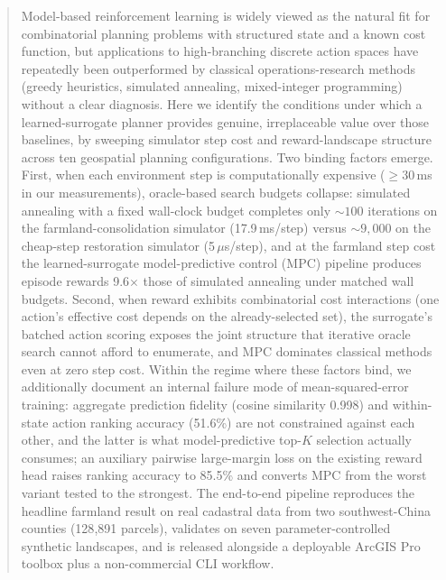 \documentclass[11pt]{article}
\begin{document}
\begin{abstract}
Model-based reinforcement learning is widely viewed as the natural fit for combinatorial planning problems with structured state and a known cost function, but applications to high-branching discrete action spaces have repeatedly been outperformed by classical operations-research methods (greedy heuristics, simulated annealing, mixed-integer programming) without a clear diagnosis. Here we identify the conditions under which a learned-surrogate planner provides genuine, irreplaceable value over those baselines, by sweeping simulator step cost and reward-landscape structure across ten geospatial planning configurations. Two binding factors emerge. First, when each environment step is computationally expensive ($\geq 30$\,ms in our measurements), oracle-based search budgets collapse: simulated annealing with a fixed wall-clock budget completes only $\sim 100$ iterations on the farmland-consolidation simulator (17.9\,ms/step) versus $\sim 9{,}000$ on the cheap-step restoration simulator (5\,$\mu$s/step), and at the farmland step cost the learned-surrogate model-predictive control (MPC) pipeline produces episode rewards 9.6$\times$ those of simulated annealing under matched wall budgets. Second, when reward exhibits combinatorial cost interactions (one action's effective cost depends on the already-selected set), the surrogate's batched action scoring exposes the joint structure that iterative oracle search cannot afford to enumerate, and MPC dominates classical methods even at zero step cost. Within the regime where these factors bind, we additionally document an internal failure mode of mean-squared-error training: aggregate prediction fidelity (cosine similarity 0.998) and within-state action ranking accuracy (51.6\%) are not constrained against each other, and the latter is what model-predictive top-$K$ selection actually consumes; an auxiliary pairwise large-margin loss on the existing reward head raises ranking accuracy to 85.5\% and converts MPC from the worst variant tested to the strongest. The end-to-end pipeline reproduces the headline farmland result on real cadastral data from two southwest-China counties (128{,}891 parcels), validates on seven parameter-controlled synthetic landscapes, and is released alongside a deployable ArcGIS Pro toolbox plus a non-commercial CLI workflow.
\end{abstract}
\end{document}
